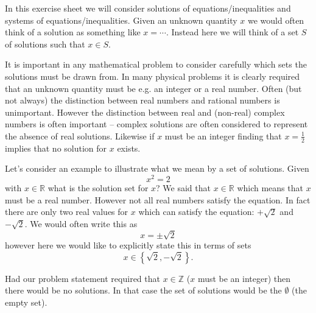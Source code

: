 In this exercise sheet we will consider solutions of equations/inequalities
and systems of equations/inequalities. Given an unknown quantity $x$ we would
often think of a solution as something like $x=\cdots$. Instead here we will
think of a set $S$ of solutions such that $x\in S$.

It is important in any mathematical problem to consider carefully which sets
the solutions must be drawn from. In many physical problems it is clearly
required that an unknown quantity must be e.g. an integer or a real number.
Often (but not always) the distinction between real numbers and rational
numbers is unimportant. However the distinction between real and (non-real)
complex numbers is often important -- complex solutions are often considered
to represent the absence of real solutions. Likewise if $x$ must be an integer
finding that $x=\frac{1}{2}$ implies that no solution for $x$ exists.

Let's consider an example to illustrate what we mean by a set of solutions.
Given
\[
    x^2 = 2
\]
with $x\in\mathbb{R}$ what is the solution set for $x$? We said that
$x\in\mathbb{R}$ which means that $x$ must be a real number. However not all
real numbers satisfy the equation. In fact there are only two real values for
$x$ which can satisfy the equation: $+\sqrt{2}$ and $-\sqrt{2}$. We would
often write this as
\[
    x = \pm\sqrt{2}
\]
however here we would like to explicitly state this in terms of sets
\[
    x\in\left\{\sqrt{2},-\sqrt{2}\right\}.
\]

Had our problem statement required that $x\in\mathbb{Z}$ ($x$ must be an
integer) then there would be no solutions. In that case the set of solutions
would be the $\emptyset$ (the empty set).
